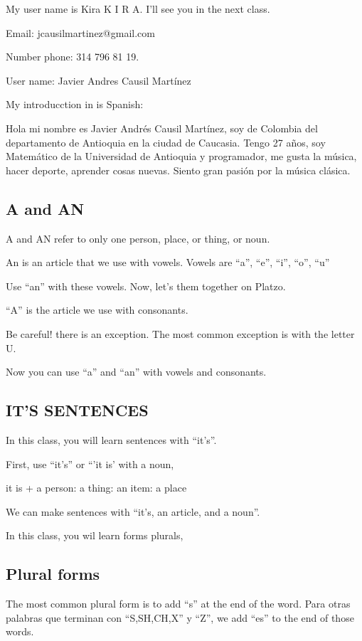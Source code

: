  My user name is Kira K I R A. I'll see you in the next class.
 
 
 Email: jcausilmartinez@gmail.com
 
 Number phone: 314 796 81 19.
 
 User name: Javier Andres Causil Martínez


My introducction in is Spanish:  

Hola mi nombre es Javier Andr\'es Causil Mart\'inez, soy de Colombia del departamento de Antioquia en la ciudad de Caucasia. Tengo 27 a\~nos, soy Matem\'atico  de la Universidad de Antioquia y programador, me gusta la m\'usica, hacer deporte, aprender cosas nuevas. Siento gran pasi\'on por la m\'usica cl\'asica. 



\subsection{A and AN}

A and AN refer to only one person, place, or thing, or noun.

An is an article that we use with vowels. Vowels are ``a'', ``e'', ``i'', ``o'', ``u''

Use ``an'' with these vowels. Now, let's them together on Platzo.

``A'' is the article we use with consonants.

Be careful! there is an exception. The most common exception is with the letter U.

Now you can use ``a'' and ``an'' with vowels and consonants.

\subsection{IT'S SENTENCES}

In this class, you will learn sentences with ``it's''.

First, use ``it's'' or ``'it is' with a noun, 

it is + a person: a thing: an item: a place

We can make sentences with ``it's, an article, and a noun''.

In this class, you wil learn forms plurals, 

\subsection{Plural forms}

The most common plural form is to add ``s'' at the end of the word. Para otras palabras que terminan con ``S,SH,CH,X'' y ``Z'', we add ``es'' to the end of those words.

